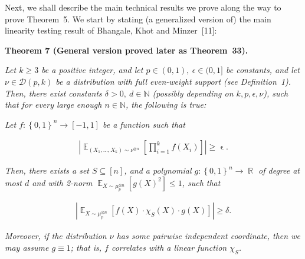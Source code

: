 \documentclass[10pt,a4paper]{article}
\begin{document}
Next, we shall describe the main technical results we prove along the way to prove Theorem 5.
We start by stating (a generalized version of) the main linearity testing result of Bhangale, Khot and Minzer [11]:\par





\par\medskip\noindent\textbf{
\textbf{Theorem 7}\textbf{ }(General version proved later as Theorem 33)\textbf{.}
}\par



\emph{Let $k\geqslant 3$ be a positive integer, and let $p\in(0,1),\ \epsilon\in(0,1]$ be constants, and let $\nu\in\mathcal{D}(p,k)$ be a distribution with full even-weight support (see Definition 1).
Then, there exist constants $\delta>0,\ d\in\mathbb{N}$ (possibly depending on $k,p,\epsilon,\nu$), such that for every large enough $n\in\mathbb{N}$, the following is true:}\par




\emph{Let $f:\left\{0,1\right\}^{n}\to[-1,1]$ be a function such that}\par


\[\begin{gathered}
\left|\mathop{\mathbb{E}}_{(X_{1},\dots,X_{k})\sim\nu^{\otimes n}}\left[\prod_{i=1}^{k}f(X_{i})\right]\right|\geqslant\mathop{\epsilon}.
\end{gathered}\]


\emph{Then, there exists a set $S\subseteq[n]$, and a polynomial $g:\left\{0,1\right\}^{n}\to\mathop{\mathbb{R}}$ of degree at most $d$ and with 2-norm $\mathop{\mathbb{E}}_{X\sim\mu_{p}^{\otimes n}}\left[g(X)^{2}\right]\leqslant 1$, such that}\par


\[\begin{gathered}
\left|\mathop{\mathbb{E}}_{X\sim\mu_{p}^{\otimes n}}\left[f(X)\cdot\chi_{S}(X)\cdot g(X)\right]\right|\geqslant\delta.
\end{gathered}\]




\emph{Moreover, if the distribution $\nu$ has some pairwise independent coordinate, then we may assume $g\equiv 1$; that is, $f$ correlates with a linear function $\chi_{S}$.}\par



\end{document}
